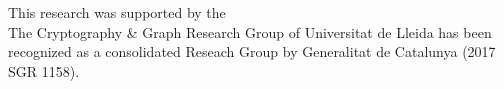 
	This research was supported by the %
	\\
	
	The Cryptography \& Graph Research Group of Universitat de Lleida has been recognized as  a consolidated Reseach Group by Generalitat de Catalunya (2017 SGR 1158).

